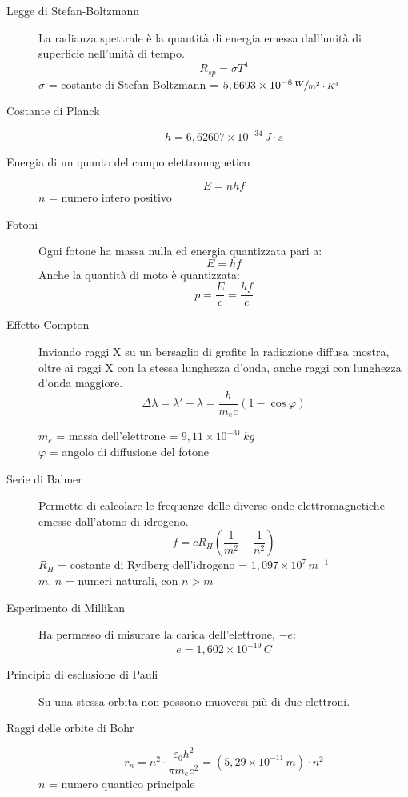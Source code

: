 \documentclass[a4paper,11pt,italian]{article}
\begin{document}
\begin{description}
  \item[Legge di Stefan-Boltzmann] 
  La radianza spettrale è la quantità di energia emessa dall'unità di superficie nell'unità di tempo.
  \[ R_{sp} = \sigma T^4 \]
  $ \sigma $ = costante di Stefan-Boltzmann = $ 5,6693 \times 10^{-8} \, \sfrac{W}{m^2 \cdot K^4} $
  
  \item[Costante di Planck]
  \[ h = 6,62607 \times 10^{-34} \, J\cdot s \]
  
  \item[Energia di un quanto del campo elettromagnetico]
  \[ E=nhf \]
  $ n $ = numero intero positivo
  
  \item[Fotoni] 
  Ogni fotone ha massa nulla ed energia quantizzata pari a:
  \[ E=hf \]
  Anche la quantità di moto è quantizzata:
  \[ p = \frac{E}{c} = \frac{hf}{c} \]
  
  \item[Effetto Compton] 
  Inviando raggi X su un bersaglio di grafite la radiazione diffusa mostra, oltre ai raggi X con la stessa lunghezza d'onda, anche raggi con lunghezza d'onda maggiore.
  \[ \Delta \lambda = \lambda' - \lambda = \frac{h}{m_e c} (1 - \cos \varphi) \]
  \begin{multicols}{2}
  $ m_e $ = massa dell'elettrone = $ 9,11 \times 10^{-31} \, kg $\\
  $ \varphi  $ = angolo di diffusione del fotone
  \end{multicols}
  
  \item[Serie di Balmer] 
  Permette di calcolare le frequenze delle diverse onde elettromagnetiche emesse dall'atomo di idrogeno.
  \[ f = c R_H \left( \frac{1}{m^2} - \frac{1}{n^2} \right) \]
  $ R_H $ = costante di Rydberg dell'idrogeno = $ 1,097 \times 10^7 \, m^{-1}$\\
  $ m $, $ n $ = numeri naturali, con $ n>m $
  
  \item[Esperimento di Millikan] 
  Ha permesso di misurare la carica dell'elettrone, $ -e $:
  \[ e = 1,602 \times 10^{-19} \, C \]
  
  \item[Principio di esclusione di Pauli] 
  Su una stessa orbita non possono muoversi più di due elettroni.
  
  \item[Raggi delle orbite di Bohr]
  \[ r_n = n^2 \cdot \frac{\varepsilon_0 h^2}{\pi m_e e^2} = (5,29 \times 10^{-11} \, m)\cdot n^2 \]
  $ n $ = numero quantico principale
  

\end{description}
\end{document}
